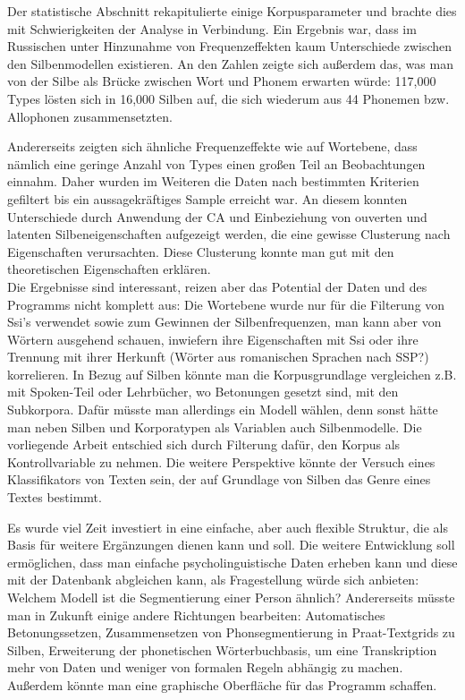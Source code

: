 \documentclass[12pt,headsepline,a4paper]{scrartcl}
\begin{document}
Der statistische Abschnitt rekapitulierte einige Korpusparameter und brachte dies mit Schwierigkeiten der Analyse in Verbindung. Ein Ergebnis war, dass im Russischen unter Hinzunahme von Frequenzeffekten kaum Unterschiede zwischen den Silbenmodellen existieren. An den Zahlen zeigte sich außerdem das, was man von der Silbe als Brücke zwischen Wort und Phonem erwarten würde: 117,000 Types lösten sich in 16,000 Silben auf, die sich wiederum aus 44 Phonemen bzw. Allophonen zusammensetzten.

Andererseits zeigten sich ähnliche Frequenzeffekte wie auf Wortebene, dass nämlich eine geringe Anzahl von Types einen großen Teil an Beobachtungen einnahm. 
Daher wurden im Weiteren die Daten nach bestimmten Kriterien gefiltert bis ein aussagekräftiges Sample erreicht war. An diesem konnten Unterschiede durch Anwendung der CA und Einbeziehung von ouverten und latenten Silbeneigenschaften  aufgezeigt werden, die eine gewisse Clusterung nach Eigenschaften verursachten. Diese Clusterung konnte man gut mit den theoretischen Eigenschaften erklären.
\\

Die Ergebnisse sind interessant, reizen aber das Potential der Daten und des Programms nicht komplett aus: Die Wortebene wurde nur für die Filterung von Ssi's verwendet sowie zum Gewinnen der Silbenfrequenzen, man kann aber von Wörtern ausgehend schauen, inwiefern  ihre Eigenschaften mit Ssi oder ihre Trennung mit ihrer Herkunft (Wörter aus romanischen Sprachen nach SSP?) korrelieren. In Bezug auf Silben könnte man die Korpusgrundlage vergleichen z.B. mit Spoken-Teil oder Lehrbücher, wo Betonungen gesetzt sind, mit den Subkorpora. Dafür müsste man allerdings ein Modell wählen, denn sonst hätte man neben Silben und Korporatypen als Variablen auch Silbenmodelle. Die vorliegende Arbeit entschied sich durch Filterung dafür, den Korpus als Kontrollvariable zu nehmen. Die weitere Perspektive könnte der Versuch eines Klassifikators von Texten sein, der auf Grundlage von Silben das Genre eines Textes bestimmt.

Es wurde viel Zeit investiert in eine einfache, aber auch flexible Struktur, die als Basis für weitere Ergänzungen dienen kann und soll. Die weitere Entwicklung soll ermöglichen, dass man einfache psycholinguistische Daten erheben kann und diese mit der Datenbank abgleichen kann, als Fragestellung würde sich anbieten: Welchem Modell ist die Segmentierung einer Person ähnlich? Andererseits müsste man in Zukunft einige andere Richtungen bearbeiten: Automatisches Betonungssetzen, Zusammensetzen von Phonsegmentierung in Praat-Textgrids zu Silben, Erweiterung der phonetischen Wörterbuchbasis, um eine Transkription mehr von Daten und weniger von formalen Regeln abhängig zu machen. Außerdem könnte man eine graphische Oberfläche für das Programm schaffen.
\newpage
\end{document}
